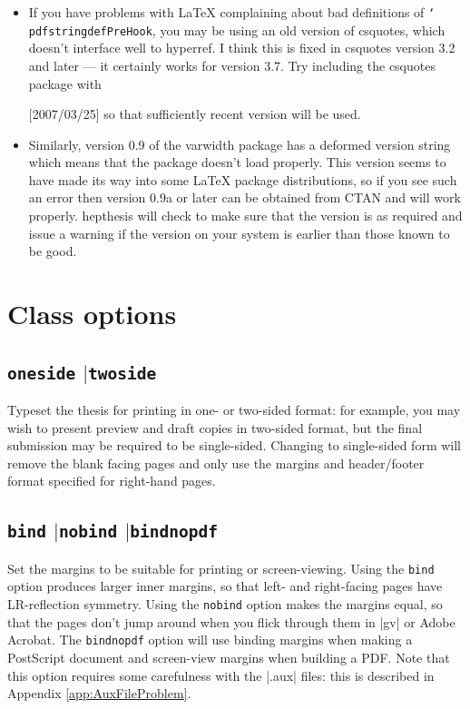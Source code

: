 \documentclass[12pt]{article}
\newcommand{\Or}{\texorpdfstring{\ensuremath{\vert}\xspace}{or}}
\newcommand{\texcmd}[1]{\texorpdfstring{\texttt{\char`\\#1}}{#1}}
\newcommand{\texopt}[1]{\texorpdfstring{\texttt{#1}}{#1}}
\newcommand{\texpkg}[1]{#1}
\newenvironment{snippet}{\Verbatim}{\endVerbatim}
\begin{document}
\begin{itemize}
\item
If you have problems with \LaTeX{} complaining about bad definitions of
\texcmd{pdfstringdefPreHook}, you may be using an old version of \texpkg{csquotes},
which doesn't interface well to \texpkg{hyperref}. I think this is fixed in
\texpkg{csquotes} version 3.2 and later --- it certainly works for version
3.7. Try including the \texpkg{csquotes} package with
%
\begin{snippet}
\usepackage{csquotes}[2007/03/25]
\end{snippet}
%
so that sufficiently recent version will be used.

\item
Similarly, version 0.9 of the \texpkg{varwidth} package has a deformed version
string which means that the package doesn't load properly. This version seems to
have made its way into some \LaTeX{} package distributions, so if you see such
an error then version 0.9a or later can be obtained from CTAN and will work
properly. \texpkg{hepthesis} will check to make sure that the version is as
required and issue a warning if the version on your system is earlier than those
known to be good.

\end{itemize}


\section{Class options}
\label{sec:Options}

\subsection{\texopt{oneside} \Or \texopt{twoside}}
Typeset the thesis for printing in one- or two-sided format: for example, you
may wish to present preview and draft copies in two-sided format, but the final
submission may be required to be single-sided. Changing to single-sided form
will remove the blank facing pages and only use the margins and header/footer
format specified for right-hand pages.

\subsection{\texopt{bind} \Or \texopt{nobind} \Or \texopt{bindnopdf}}
Set the margins to be suitable for printing or screen-viewing. Using the
\texopt{bind} option produces larger inner margins, so that left- and
right-facing pages have LR-reflection symmetry. Using the \texopt{nobind}
option makes the margins equal, so that the pages don't jump around when you
flick through them in |gv| or Adobe Acrobat. The \texopt{bindnopdf} option
will use binding margins when making a PostScript document and screen-view
margins when building a PDF. Note that this option requires some carefulness
with the |.aux| files: this is described in Appendix \ref{app:AuxFileProblem}.
\end{document}
